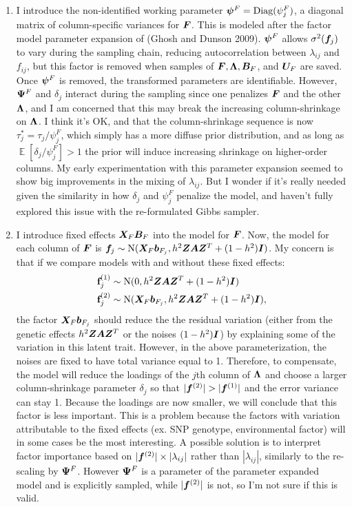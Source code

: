 \documentclass[11pt]{amsart}
\newcommand*{\B}[1]{\ifmmode\bm{#1}\else\textbf{#1}\fi}
\DeclareMathOperator{\E}{\mathbb{E}}
\begin{document}
\begin{enumerate}
\item I introduce the non-identified working parameter $\B{\psi}^F = \mbox{Diag}(\psi^F_j)$, a diagonal matrix of column-specific variances for $\B{F}$. This is modeled after the factor model parameter expansion of (Ghosh and Dunson 2009). $\B{\psi}^F$ allows $\sigma^2(\B{f}_j)$ to vary during the sampling chain, reducing autocorrelation between $\lambda_{ij}$ and $f_{ij}$, but this factor is removed when samples of $\B{F}, \B{\Lambda}, \B{B}_F$, and $\B{U}_F$ are saved. Once $\B{\psi}^F$ is removed, the transformed parameters are identifiable. However, $\B{\Psi}^F$ and ${\delta_j}$ interact during the sampling since one penalizes $\B{F}$ and the other $\B{\Lambda}$, and I am concerned that this may break the increasing column-shrinkage on $\B{\Lambda}$. I think it's OK, and that the column-shrinkage sequence is now ${\tau^*_j} = {\tau_j / \psi^F_j}$, which simply has a more diffuse prior distribution, and as long as $\E[\delta_j/\psi^F_j]>1$ the prior will induce increasing shrinkage on higher-order columns. My early experimentation with this parameter expansion seemed to show big improvements in the mixing of $\lambda_{ij}$. But I wonder if it's really needed given the similarity in how $\delta_j$ and $\psi^F_j$ penalize the model, and haven't fully explored this issue with the re-formulated Gibbs sampler.

\item I introduce fixed effects $\B{X}_F\B{B}_F$ into the model for $\B{F}$. Now, the model for each column of $\B{F}$ is $\B{f}_j \sim \mbox{N}(\B{X}_F\B{b}_{F_j},h^2\B{ZAZ}^T + (1-h^2)\B{I})$. My concern is that if we compare models with and without these fixed effects: 
\begin{align*}
\B{f}^{(1)}_j &\sim \mbox{N}(0, h^2\B{ZAZ}^T + (1-h^2)\B{I}) \\
\B{f}^{(2)}_j &\sim \mbox{N}(\B{X}_F\B{b}_{F_j},h^2\B{ZAZ}^T + (1-h^2)\B{I}),
\end{align*}
\noindent the factor $\B{X}_F\B{b}_{F_j}$ should reduce the the residual variation (either from the genetic effects $h^2\B{ZAZ}^T$ or the noises $(1-h^2)\B{I}$) by explaining some of the variation in this latent trait. However, in the above parameterization, the noises are fixed to have total variance equal to 1. Therefore, to compensate, the model will reduce the loadings of the $j$th column of $\B{\Lambda}$ and choose a larger column-shrinkage parameter $\delta_j$ so that $|\B{f}^{(2)}| > |\B{f}^{(1)}|$ and the error variance can stay 1. Because the loadings are now smaller, we will conclude that this factor is less important. This is a problem because the factors with variation attributable to the fixed effects (ex. SNP genotype, environmental factor) will in some cases be the most interesting. A possible solution is to interpret factor importance based on $|\B{f}^{(2)}| \times |\lambda_{ij}|$ rather than $|\lambda_{ij}|$, similarly to the re-scaling by $\B{\Psi}^F$. However $\B{\Psi}^F$ is a parameter of the parameter expanded model and is explicitly sampled, while $|\B{f}^{(2)}|$ is not, so I'm not sure if this is valid.
\end{enumerate}
\end{document}

